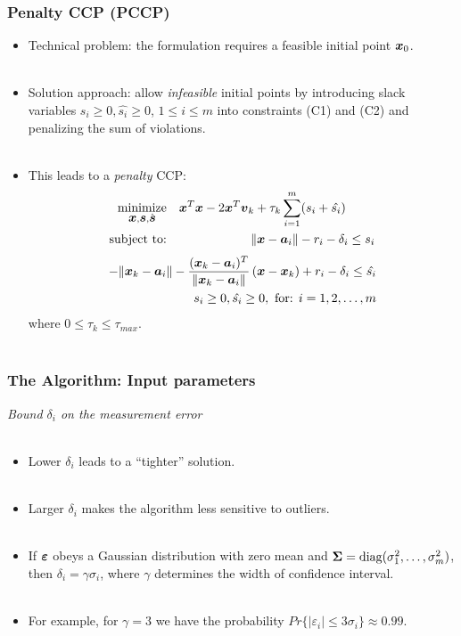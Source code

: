\documentclass [t] {beamer} %
\begin{document}
\begin{frame} %
\frametitle{ Penalty CCP (PCCP) } 
\begin{itemize}
\item
Technical problem: the formulation requires a feasible initial point $\mbox{\boldmath$x$}_0$. \\~\\

\item
Solution approach: allow \textit{infeasible} initial points by introducing slack variables {$s_i \geq 0, \hat{s_i} \geq 0$, $ 1\leq i \leq m$} into constraints (C1) and (C2) and penalizing the sum of violations. 
 \\~\\
\item
This leads to a \textit{penalty} CCP:%
\setlength{\belowdisplayskip}{0pt} \setlength{\belowdisplayshortskip}{0pt}
\begin{eqnarray} %
\nonumber
  \Min_{\Bx, \Bs, \hat{\Bs}}&&\Bx^T\Bx - 2\Bx^T \Bv_k + \tau_k \sum^m_{i=1} (s_i + \hat{s_i}) \qquad \  \\
\nonumber
\mbox{subject to:}&&\| \Bx - \Ba_i\| - r_i - \delta_i \leq s_i  
\end{eqnarray}
\begin{eqnarray}
\nonumber
 -\| \mbox{\boldmath$x$}_k - \mbox{\boldmath$a$}_i\| -\frac{(\mbox{\boldmath$x$}_k - \mbox{\boldmath$a$}_i)^T}{\| \mbox{\boldmath$x$}_k - \mbox{\boldmath$a$}_i\|}\left(\mbox{\boldmath$x$} - \mbox{\boldmath$x$}_k\right) + r_i - \delta_i   \leq \hat{s_i} \\
\nonumber
\qquad s_i \geq 0,  \hat{s_i}  \geq 0, \ \mbox{for: }  i = 1, 2, \ldots, m  
\end{eqnarray}
where $ 0 \leq \tau_k \leq \tau_{max}$.
\\~\\
\end{itemize}
\end{frame}


\begin{frame} %
\frametitle{The Algorithm: Input parameters}
{\large \textit{Bound $\delta_i$ on the measurement error}}
\\~\\
\begin{itemize}
\item
Lower $\delta_i$ leads to a ``tighter'' solution.
\\~\\
\item
 Larger $\delta_i$ makes the algorithm less sensitive to outliers.
\\~\\
\item
 If $\mbox{\boldmath${\varepsilon}$}$ obeys a Gaussian distribution with zero mean and $\mbox{\boldmath${\Sigma}$} = \mbox{diag}(\sigma_1^2, \ldots, \sigma_m^2)$, then $\delta_i = \gamma \sigma_i$, where $\gamma$ determines the width of  confidence interval.
 \\~\\
 \item
 For example, for $\gamma = 3$ we have the probability $Pr\{|\varepsilon_i| \leq 3\sigma_i\} \approx 0.99$.

\end{itemize}
\end{frame}
\end{document}
